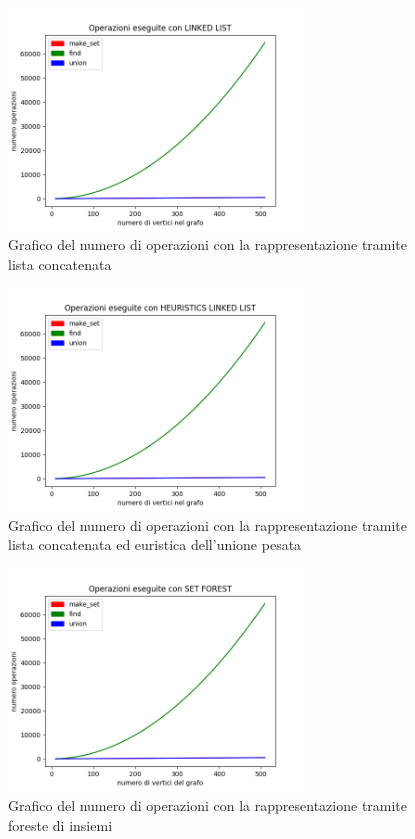\documentclass[12pt]{article}
\begin{document}
    \begin{figure}[h]
        \includegraphics[width=0.7\textwidth]{images/results/count_ll.png}
        \caption{Grafico del numero di operazioni con la rappresentazione tramite lista concatenata}
        \label{fig:count_ll}
    \end{figure}

    \begin{figure}[h]
        \includegraphics[width=0.7\textwidth]{images/results/count_llh.png}
        \caption{Grafico del numero di operazioni con la rappresentazione tramite lista concatenata ed euristica dell'unione pesata}
        \label{fig:count_llh}
    \end{figure}

    \begin{figure}[h]
        \includegraphics[width=0.7\textwidth]{images/results/count_sf.png}
        \caption{Grafico del numero di operazioni con la rappresentazione tramite foreste di insiemi}
        \label{fig:count_sf}
    \end{figure}
\end{document}
